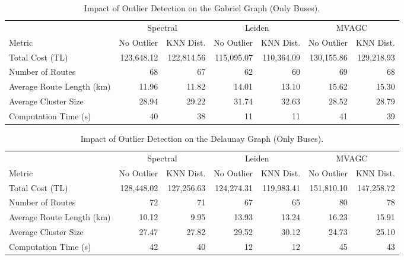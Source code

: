 \begin{table}[h]
\centering
\scriptsize{
\setlength{\tabcolsep}{4pt}
\begin{tabular}{lrrrrrr}
\toprule
& \multicolumn{2}{c}{Spectral} & \multicolumn{2}{c}{Leiden} & \multicolumn{2}{c}{MVAGC} \\
\cmidrule(lr){2-3} \cmidrule(lr){4-5} \cmidrule(lr){6-7}
Metric & No Outlier & KNN Dist. & No Outlier & KNN Dist. & No Outlier & KNN Dist. \\
\midrule
Total Cost (TL) & 123,648.12 & 122,814.56 & 115,095.07 & 110,364.09 & 130,155.86 & 129,218.93 \\
Number of Routes & 68 & 67 & 62 & 60 & 69 & 68 \\
Average Route Length (km) & 11.96 & 11.82 & 14.01 & 13.10 & 15.62 & 15.30 \\
Average Cluster Size & 28.94 & 29.22 & 31.74 & 32.63 & 28.52 & 28.79 \\
Computation Time (s) & 40 & 38 & 11 & 11 & 41 & 39 \\ 
\bottomrule
\end{tabular}
}
\caption{Impact of Outlier Detection on the Gabriel Graph (Only Buses).}
\label{tab:outlier_gabriel_results}
\end{table}

\begin{table}[h]
\centering
\scriptsize{
\setlength{\tabcolsep}{4pt}
\begin{tabular}{lrrrrrr}
\toprule
& \multicolumn{2}{c}{Spectral} & \multicolumn{2}{c}{Leiden} & \multicolumn{2}{c}{MVAGC} \\
\cmidrule(lr){2-3} \cmidrule(lr){4-5} \cmidrule(lr){6-7}
Metric & No Outlier & KNN Dist. & No Outlier & KNN Dist. & No Outlier & KNN Dist. \\
\midrule
Total Cost (TL) & 128,448.02 & 127,256.63 & 124,274.31 & 119,983.41 & 151,810.10 & 147,258.72 \\
Number of Routes & 72 & 71 & 67 & 65 & 80 & 78 \\
Average Route Length (km) & 10.12 & 9.95 & 13.93 & 13.24 & 16.23 & 15.91 \\
Average Cluster Size & 27.47 & 27.82 & 29.52 & 30.12 & 24.73 & 25.10 \\
Computation Time (s) & 42 & 40 & 12 & 12 & 45 & 43 \\
\bottomrule
\end{tabular}
}
\caption{Impact of Outlier Detection on the Delaunay Graph (Only Buses).}
\label{tab:outlier_delaunay_results}
\end{table}

